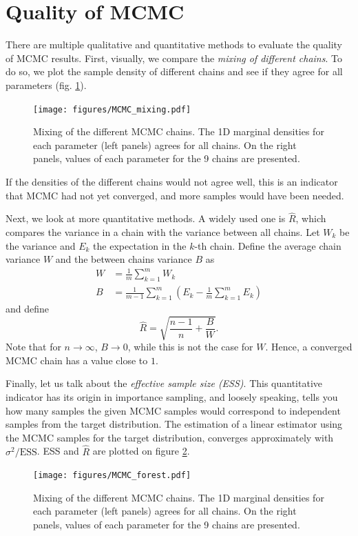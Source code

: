 \documentclass[draft]{agujournal2019}
\begin{document}
\section{Quality of MCMC}\label{apdx: quality_of_MCMC}
%
There are multiple qualitative and quantitative methods to evaluate the quality of MCMC results.
First, visually, we compare the \emph{mixing of different chains}.
To do so, we plot the sample density of different chains and see if they agree for all parameters (fig. \ref{fig:mixing_of_MCMC_chains}).
\begin{figure}
	\centering
	\texttt{[image: figures/MCMC\_mixing.pdf]}
	\caption{Mixing of the different MCMC chains. The 1D marginal densities for each parameter (left panels) agrees for all chains. On the right panels, values of each parameter for the 9 chains are presented.}\label{fig:mixing_of_MCMC_chains}
\end{figure}
If the densities of the different chains would not agree well, this is an indicator that MCMC had not yet converged, and more samples would have been needed.
%
\par Next, we look at more quantitative methods.
A widely used one is $\hat{R}$, which compares the variance in a chain with the variance between all chains.
Let $W_k$ be the variance and $E_k$ the expectation in the $k$-th chain.
Define the average chain variance $W$ and the between chains variance $B$ as
\begin{align}
	W &= \frac{1}{m} \sum_{k=1}^{m} W_{k} \\
	B &= \frac{1}{m-1} \sum_{k=1}^{m} \left(E_k - \frac{1}{m} \sum_{k=1}^{m} E_k\right)
\end{align}
and define
\begin{equation}
	\hat{R} = \sqrt{\frac{n-1}{n} + \frac{B}{W}}.
\end{equation}
Note that for $n \rightarrow \infty$, $B \rightarrow 0$, while this is not the case for $W$. Hence, a converged MCMC chain has a value close to $1$.

Finally, let us talk about the \emph{effective sample size (ESS)}.
This quantitative indicator has its origin in importance sampling, and loosely speaking, tells you how many samples the given MCMC samples would correspond to independent samples from the target distribution.
The estimation of a linear estimator using the MCMC samples for the target distribution, converges approximately with $\sigma^2 / \mathrm{ESS}$. 
ESS and $\hat{R}$ are plotted on figure \ref{fig:forest_of_MCMC_chains}.
%
\begin{figure}
	\centering
	\texttt{[image: figures/MCMC\_forest.pdf]}
	\caption{Mixing of the different MCMC chains. The 1D marginal densities for each parameter (left panels) agrees for all chains. On the right panels, values of each parameter for the 9 chains are presented.}\label{fig:forest_of_MCMC_chains}
\end{figure}
\end{document}
